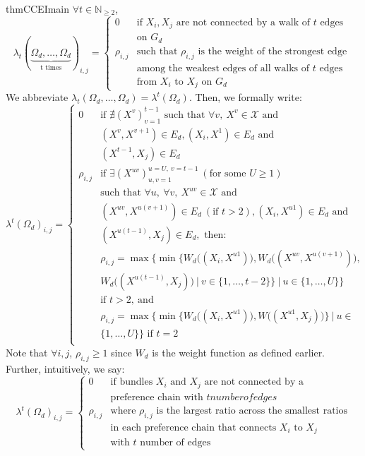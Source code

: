 \documentclass{article} %
\theoremstyle{style1}
\theoremstyle{style1}
\theoremstyle{example}
\begin{document}
\begin{restatable}{thm}{CCEImain}
\label{thm:CCEI_main}
$\forall t\in \mathbb{N}_{\geq2}$,
\[
  \lambda_t(\underbrace{\Omega_d,\ldots,\Omega_d}_\text{t times})_{i,j}=
  \begin{cases}
  0 & \textrm{if } X_i, X_j\textrm{ are not connected by a walk of }t \textrm{ edges} \\
  & \textrm{on }G_d \\
  \rho_{i,j} & \textrm{such that }\rho_{i,j}\textrm{ is the weight of the strongest edge } \\
  &\textrm{among the weakest edges of all walks of } t \textrm{ edges} \\
  & \textrm{from }X_i\textrm{ to }X_j \textrm{ on } G_d
  \end{cases}
\]
We abbreviate $\lambda_t(\Omega_d,\ldots,\Omega_d)=\lambda^t(\Omega_d)$. Then, we formally write:
\[
  \lambda^t(\Omega_d)_{i,j}=
  \begin{cases}
  0 & \textrm{if } \nexists (X^v)_{v=1}^{t-1} \textrm{ such that } \forall v,\ X^v\in\mathcal{X}\textrm{ and } \\
  & (X^v,X^{v+1})\in E_d, (X_i,X^1)\in E_d \textrm{ and } \\
  & (X^{t-1},X_j)\in E_d\\ 
  \rho_{i,j} & \textrm{if }\exists (X^{uv})_{u,v=1}^{u=U,\ v=t-1}\ (\textrm{for some }U\geq1) \\
  & \textrm{such that }\forall u,\ \forall v,\ X^{uv}\in\mathcal{X} \textrm{ and } \\
  & (X^{uv},X^{u(v+1)})\in E_d\ (\textrm{if }t>2), (X_i, X^{u1})\in E_d \textrm{ and } \\
  & (X^{u(t-1)},X_j)\in E_d, \textrm{ then: } \\
  & \rho_{i,j}=\max\Big\{\min\big\{W_d\big((X_i,X^{u1})\big),W_d\big((X^{uv},X^{u(v+1)})\big), \\
  & W_d\big((X^{u(t-1)},X_j)\big)\ |\ v\in\{1,\ldots,t-2\}\big\}\ |\ u\in\{1,\ldots,U\}\Big\} \\
  &\textrm{if } t>2,\ \textrm{and }\\
  &\rho_{i,j}=\max\Big\{\min\big\{W_d\big((X_i,X^{u1})\big), W\big((X^{u1},X_j)\big)\big\}\ |\ u\in\\
  &\{1,\ldots,U\}\Big\} \textrm{ if } t=2\\
  \end{cases}
\]
Note that $\forall i,j$, $\rho_{i,j}\geq1$ since $W_d$ is the weight function as defined earlier. Further, intuitively, we say:
\[
  \lambda^t(\Omega_d)_{i,j}=
  \begin{cases}
  0 & \textrm{if bundles }X_i \textrm{ and }X_j\textrm{ are not connected by a} \\
  & \textrm{preference chain with } t { number of edges}\\
  \rho_{i,j} & \textrm{where }\rho_{i,j}\textrm{ is the largest ratio across the smallest ratios} \\
  & \textrm{in each preference chain that connects } X_i\textrm{ to } X_j \\ 
  & \textrm{with }t\textrm{ number of edges }
  \end{cases}
\]
\end{restatable}
\end{document}
